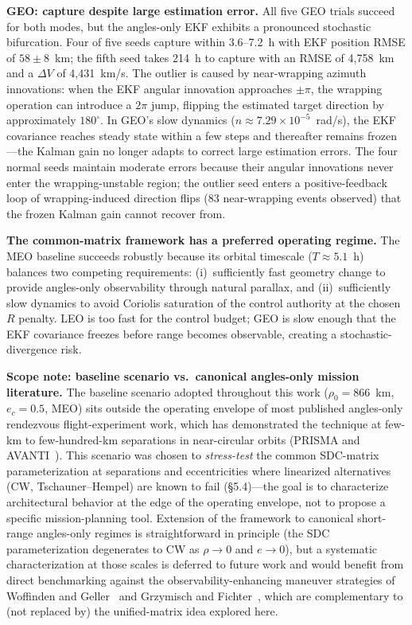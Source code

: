 \documentclass[preprint,3p,times]{elsarticle}
\begin{document}
\textbf{GEO: capture despite large estimation error.} All five GEO trials succeed for both modes, but the angles-only EKF exhibits a pronounced stochastic bifurcation. Four of five seeds capture within 3.6--7.2~h with EKF position RMSE of $58 \pm 8$~km; the fifth seed takes 214~h to capture with an RMSE of 4,758~km and a $\Delta V$ of 4,431~km/s. The outlier is caused by near-wrapping azimuth innovations: when the EKF angular innovation approaches $\pm\pi$, the wrapping operation can introduce a $2\pi$ jump, flipping the estimated target direction by approximately $180^\circ$. In GEO's slow dynamics ($n \approx 7.29 \times 10^{-5}$~rad/s), the EKF covariance reaches steady state within a few steps and thereafter remains frozen---the Kalman gain no longer adapts to correct large estimation errors. The four normal seeds maintain moderate errors because their angular innovations never enter the wrapping-unstable region; the outlier seed enters a positive-feedback loop of wrapping-induced direction flips (83 near-wrapping events observed) that the frozen Kalman gain cannot recover from.

\textbf{The common-matrix framework has a preferred operating regime.} The MEO baseline succeeds robustly because its orbital timescale ($T \approx 5.1$~h) balances two competing requirements: (i)~sufficiently fast geometry change to provide angles-only observability through natural parallax, and (ii)~sufficiently slow dynamics to avoid Coriolis saturation of the control authority at the chosen $R$ penalty. LEO is too fast for the control budget; GEO is slow enough that the EKF covariance freezes before range becomes observable, creating a stochastic-divergence risk.

\textbf{Scope note: baseline scenario vs.\ canonical angles-only mission literature.} The baseline scenario adopted throughout this work ($\rho_0 = 866$~km, $e_c = 0.5$, MEO) sits outside the operating envelope of most published angles-only rendezvous flight-experiment work, which has demonstrated the technique at few-km to few-hundred-km separations in near-circular orbits (PRISMA and AVANTI~\cite{Gaias2014,Sullivan2017,Sullivan2021}). This scenario was chosen to \emph{stress-test} the common SDC-matrix parameterization at separations and eccentricities where linearized alternatives (CW, Tschauner--Hempel) are known to fail (§5.4)---the goal is to characterize architectural behavior at the edge of the operating envelope, not to propose a specific mission-planning tool. Extension of the framework to canonical short-range angles-only regimes is straightforward in principle (the SDC parameterization degenerates to CW as $\rho \to 0$ and $e \to 0$), but a systematic characterization at those scales is deferred to future work and would benefit from direct benchmarking against the observability-enhancing maneuver strategies of Woffinden and Geller~\cite{Woffinden2009b} and Grzymisch and Fichter~\cite{Grzymisch2014}, which are complementary to (not replaced by) the unified-matrix idea explored here.
\end{document}
